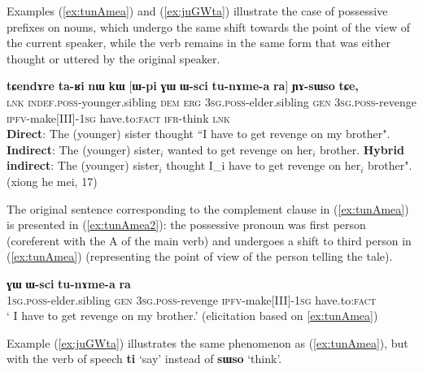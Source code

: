 \documentclass[oneside,a4paper,11pt]{article}
\newcommand{\ipa}[1]{\textbf{\phon#1}} %
\newcommand{\bleu}[1]{{\color{blue}#1}}
\newcommand{\rouge}[1]{{\color{red}#1}}
\newcommand{\refb}[1]{(\ref{#1})}
\begin{document}
Examples \refb{ex:tunAmea} and \refb{ex:juGWta} illustrate the case of possessive prefixes on nouns, which undergo the same shift towards the point of the view of the current speaker, while the verb remains in the same form that was either thought or uttered by the original speaker.

\begin{exe}
\ex \label{ex:tunAmea}
\gll  \ipa{tɕendɤre}  	\ipa{ta-ʁi}  	\ipa{nɯ}  	\ipa{kɯ}  	[\rouge{\ipa{ɯ-pi}}  	\ipa{ɣɯ}  	\ipa{ɯ-sci}  	\bleu{\ipa{tu-nɤme-a}}  	\ipa{ra}] 	\ipa{ɲɤ-sɯso}  	\ipa{tɕe,}  	\\
\textsc{lnk}  \textsc{indef.poss}-younger.sibling \textsc{dem} \textsc{erg}  {\textsc{3sg.poss}-elder.sibling}  \textsc{gen} \textsc{3sg.poss}-revenge {\textsc{ipfv}-make[III]-\textsc{1sg}} have.to:\textsc{fact} \textsc{ifr}-think \textsc{lnk} \\
\glt  \textbf{Direct}: The (younger) sister thought ``\bleu{I have to get revenge} on {my brother}".
\glt  \textbf{Indirect}:  The (younger) sister$_i$ \rouge{wanted to get revenge on her$_i$ brother}.
\glt  \textbf{Hybrid indirect}:  The (younger) sister$_i$ thought \bleu{I_i have to get revenge} on \rouge{her$_i$ brother}". (xiong he mei, 17)
  \end{exe}
  
The original sentence corresponding to the complement clause in \refb{ex:tunAmea} is presented in \refb{ex:tunAmea2}: the possessive pronoun was first person (coreferent with the A of the main verb) and undergoes a shift to third person in \refb{ex:tunAmea} (representing the point of view of the person telling the tale).

  \begin{exe}
\ex \label{ex:tunAmea2}
\gll \bleu{\ipa{a-pi}}  	\ipa{ɣɯ}  	\ipa{ɯ-sci}  	\bleu{\ipa{tu-nɤme-a}}  	\ipa{ra}	\\
 {\textsc{1sg.poss}-elder.sibling}  \textsc{gen} \textsc{3sg.poss}-revenge {\textsc{ipfv}-make[III]-\textsc{1sg}} have.to:\textsc{fact}  \\
\glt ` I have to get revenge on my brother.' (elicitation based on \ref{ex:tunAmea})
  \end{exe}
  
  Example \refb{ex:juGWta} illustrates the same phenomenon as \refb{ex:tunAmea}, but with the verb of speech \ipa{ti} `say' instead of \ipa{sɯso} `think'.
 
\end{document}
